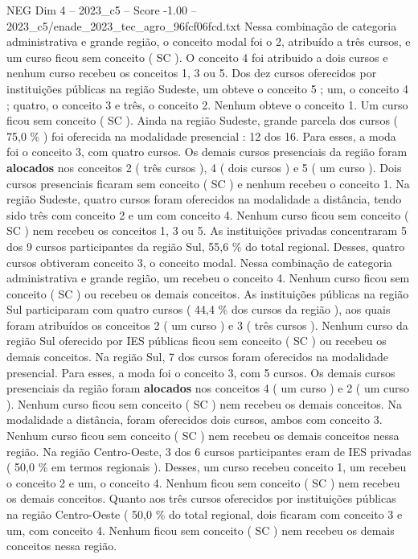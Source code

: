 \begin{textsample}{NEG Dim 4 – 2023\_c5 – Score -1.00 – 2023\_c5/enade\_2023\_tec\_agro\_96fcf06fcd.txt}
Nessa combinação de categoria administrativa e grande região, o conceito modal foi o 2, atribuído a três cursos, e um curso ficou sem conceito ( SC ).
O conceito 4 foi atribuido a dois cursos e nenhum curso recebeu os conceitos 1, 3 ou 5.
Dos dez cursos oferecidos por instituições públicas na região Sudeste, um obteve o conceito 5 ; um, o conceito 4 ; quatro, o conceito 3 e três, o conceito 2.
Nenhum obteve o conceito 1.
Um curso ficou sem conceito ( SC ).
Ainda na região Sudeste, grande parcela dos cursos ( 75,0 \% ) foi oferecida na modalidade presencial : 12 dos 16.
Para esses, a moda foi o conceito 3, com quatro cursos.
Os demais cursos presenciais da região foram \textbf{alocados} nos conceitos 2 ( três cursos ), 4 ( dois cursos ) e 5 ( um curso ).
Dois cursos presenciais ficaram sem conceito ( SC ) e nenhum recebeu o conceito 1.
Na região Sudeste, quatro cursos foram oferecidos na modalidade a distância, tendo sido três com conceito 2 e um com conceito 4.
Nenhum curso ficou sem conceito ( SC ) nem recebeu os conceitos 1, 3 ou 5.
As instituições privadas concentraram 5 dos 9 cursos participantes da região Sul, 55,6 \% do total regional.
Desses, quatro cursos obtiveram conceito 3, o conceito modal.
Nessa combinação de categoria administrativa e grande região, um recebeu o conceito 4.
Nenhum curso ficou sem conceito ( SC ) ou recebeu os demais conceitos.
As instituições públicas na região Sul participaram com quatro cursos ( 44,4 \% dos cursos da região ), aos quais foram atribuídos os conceitos 2 ( um curso ) e 3 ( três cursos ).
Nenhum curso da região Sul oferecido por IES públicas ficou sem conceito ( SC ) ou recebeu os demais conceitos.
Na região Sul, 7 dos cursos foram oferecidos na modalidade presencial.
Para esses, a moda foi o conceito 3, com 5 cursos.
Os demais cursos presenciais da região foram \textbf{alocados} nos conceitos 4 ( um curso ) e 2 ( um curso ).
Nenhum curso ficou sem conceito ( SC ) nem recebeu os demais conceitos.
Na modalidade a distância, foram oferecidos dois cursos, ambos com conceito 3.
Nenhum curso ficou sem conceito ( SC ) nem recebeu os demais conceitos nessa região.
Na região Centro-Oeste, 3 dos 6 cursos participantes eram de IES privadas ( 50,0 \% em termos regionais ).
Desses, um curso recebeu conceito 1, um recebeu o conceito 2 e um, o conceito 4.
Nenhum ficou sem conceito ( SC ) nem recebeu os demais conceitos.
Quanto aos três cursos oferecidos por instituições públicas na região Centro-Oeste ( 50,0 \% do total regional, dois ficaram com conceito 3 e um, com conceito 4.
Nenhum ficou sem conceito ( SC ) nem recebeu os demais conceitos nessa região.

\end{textsample}

